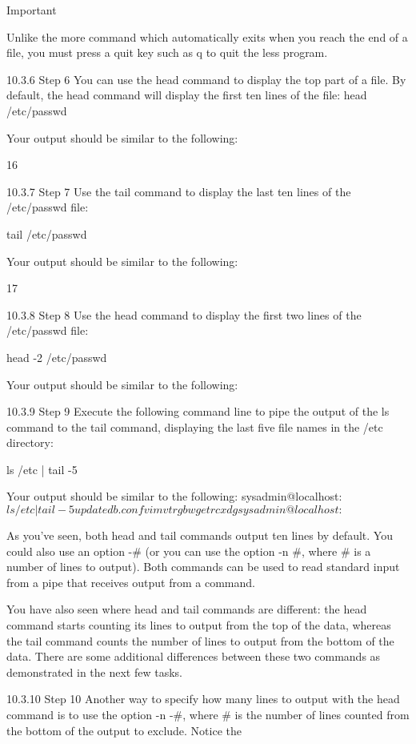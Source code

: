 Important

Unlike the more command which automatically exits when you reach the end of a file, you must
press a quit key such as q to quit the less program.

10.3.6 Step 6
You can use the head command to display the top part of a file. By default, the head command
will display the first ten lines of the file:
head /etc/passwd

Your output should be similar to the following:

16



10.3.7 Step 7
Use the tail command to display the last ten lines of the /etc/passwd file:

tail /etc/passwd

Your output should be similar to the following:

17



10.3.8 Step 8
Use the head command to display the first two lines of the /etc/passwd file:

head -2 /etc/passwd

Your output should be similar to the following:

10.3.9 Step 9
Execute the following command line to pipe the output of the ls command to the tail
command, displaying the last five file names in the /etc directory:

ls /etc | tail -5

Your output should be similar to the following:
sysadmin@localhost:~$ ls /etc | tail -5
updatedb.conf
vim
vtrgb
wgetrc
xdg
sysadmin@localhost:~$

As you've seen, both head and tail commands output ten lines by default. You could also use
an option -# (or you can use the option -n #, where # is a number of lines to output). Both
commands can be used to read standard input from a pipe that receives output from a command.

You have also seen where head and tail commands are different: the head command starts
counting its lines to output from the top of the data, whereas the tail command counts the
number of lines to output from the bottom of the data. There are some additional differences
between these two commands as demonstrated in the next few tasks.

10.3.10 Step 10
Another way to specify how many lines to output with the head command is to use the option -n
-#, where # is the number of lines counted from the bottom of the output to exclude. Notice the

